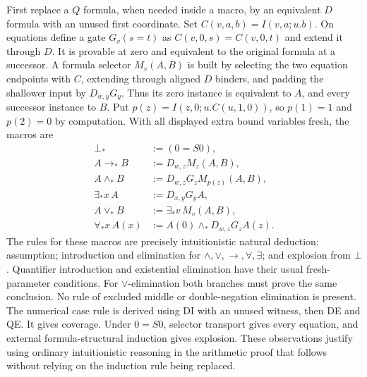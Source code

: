\documentclass[11pt]{article}
\theoremstyle{definition}\newtheorem{definition}[theorem]{Definition}
\begin{document}
First replace a $Q$ formula, when needed inside a macro, by an equivalent
$D$ formula with an unused first coordinate.  Set
$C(v,a,b)=I(v,a;u.b)$.  On equations define a gate
$G_v(s=t)$ as $C(v,0,s)=C(v,0,t)$ and extend it through $D$.
It is provable at zero and equivalent to the original formula at a
successor.  A formula selector $M_v(A,B)$ is built by selecting the two
equation endpoints with $C$, extending through aligned $D$ binders,
and padding the shallower input by $D_{w,y}G_y$.  Thus its zero instance
is equivalent to $A$, and every successor instance to $B$.
Put $p(z)=I(z,0;u.C(u,1,0))$, so $p(1)=1$ and $p(2)=0$ by computation.
With all displayed extra bound variables fresh, the macros are
\begin{align*}
 \bot_*&:=(0=S0),\\
 A\to_*B&:=D_{w,z}M_z(A,B),\\
 A\land_*B&:=D_{w,z}G_zM_{p(z)}(A,B),\\
 \exists_*x\,A&:=D_{x,y}G_yA,\\
 A\lor_*B&:=\exists_*v\,M_v(A,B),\\
 \forall_*x\,A(x)&:=A(0)\land_*D_{w,z}G_zA(z).
\end{align*}
The rules for these macros are precisely intuitionistic natural deduction:
assumption; introduction and elimination for $\land,\lor,\to,\forall,
\exists$; and explosion from $\bot$.  Quantifier introduction and
existential elimination have their usual fresh-parameter conditions.
For $\lor$-elimination both branches must prove the same conclusion.
No rule of excluded middle or double-negation elimination is present.
The numerical case rule is derived using DI with an unused witness,
then DE and QE.  It gives coverage.  Under $0=S0$, selector transport
gives every equation, and external formula-structural induction gives
explosion.  These observations justify using ordinary intuitionistic
reasoning in the arithmetic proof that follows without relying on the
induction rule being replaced.
\end{document}
